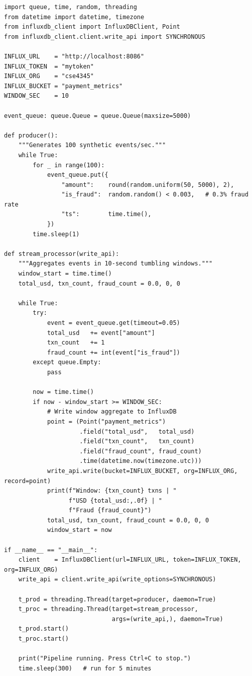 \begin{lstlisting}[style=pyspark, caption={PE9.3: Streaming aggregation and InfluxDB write}]
import queue, time, random, threading
from datetime import datetime, timezone
from influxdb_client import InfluxDBClient, Point
from influxdb_client.client.write_api import SYNCHRONOUS

INFLUX_URL    = "http://localhost:8086"
INFLUX_TOKEN  = "mytoken"
INFLUX_ORG    = "cse4345"
INFLUX_BUCKET = "payment_metrics"
WINDOW_SEC    = 10

event_queue: queue.Queue = queue.Queue(maxsize=5000)

def producer():
    """Generates 100 synthetic events/sec."""
    while True:
        for _ in range(100):
            event_queue.put({
                "amount":    round(random.uniform(50, 5000), 2),
                "is_fraud":  random.random() < 0.003,   # 0.3% fraud rate
                "ts":        time.time(),
            })
        time.sleep(1)

def stream_processor(write_api):
    """Aggregates events in 10-second tumbling windows."""
    window_start = time.time()
    total_usd, txn_count, fraud_count = 0.0, 0, 0

    while True:
        try:
            event = event_queue.get(timeout=0.05)
            total_usd   += event["amount"]
            txn_count   += 1
            fraud_count += int(event["is_fraud"])
        except queue.Empty:
            pass

        now = time.time()
        if now - window_start >= WINDOW_SEC:
            # Write window aggregate to InfluxDB
            point = (Point("payment_metrics")
                     .field("total_usd",   total_usd)
                     .field("txn_count",   txn_count)
                     .field("fraud_count", fraud_count)
                     .time(datetime.now(timezone.utc)))
            write_api.write(bucket=INFLUX_BUCKET, org=INFLUX_ORG, record=point)
            print(f"Window: {txn_count} txns | "
                  f"USD {total_usd:,.0f} | "
                  f"Fraud {fraud_count}")
            total_usd, txn_count, fraud_count = 0.0, 0, 0
            window_start = now

if __name__ == "__main__":
    client    = InfluxDBClient(url=INFLUX_URL, token=INFLUX_TOKEN, org=INFLUX_ORG)
    write_api = client.write_api(write_options=SYNCHRONOUS)

    t_prod = threading.Thread(target=producer, daemon=True)
    t_proc = threading.Thread(target=stream_processor,
                              args=(write_api,), daemon=True)
    t_prod.start()
    t_proc.start()

    print("Pipeline running. Press Ctrl+C to stop.")
    time.sleep(300)   # run for 5 minutes
\end{lstlisting}

